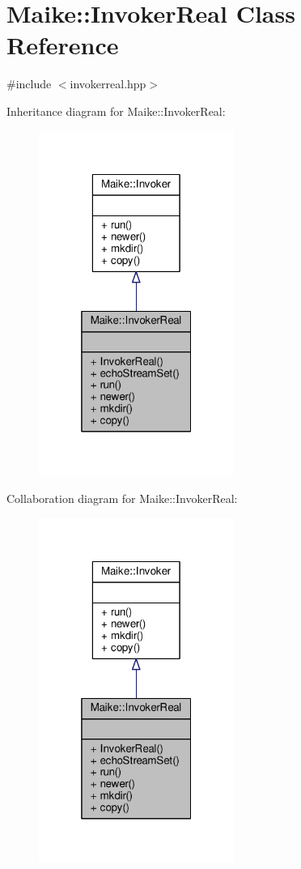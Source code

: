 \hypertarget{class_maike_1_1_invoker_real}{}\section{Maike\+:\+:Invoker\+Real Class Reference}
\label{class_maike_1_1_invoker_real}


{\ttfamily \#include $<$invokerreal.\+hpp$>$}



Inheritance diagram for Maike\+:\+:Invoker\+Real\+:\nopagebreak
\begin{figure}[H]
\begin{center}
\leavevmode
\includegraphics[width=181pt]{class_maike_1_1_invoker_real__inherit__graph}
\end{center}
\end{figure}


Collaboration diagram for Maike\+:\+:Invoker\+Real\+:\nopagebreak
\begin{figure}[H]
\begin{center}
\leavevmode
\includegraphics[width=181pt]{class_maike_1_1_invoker_real__coll__graph}
\end{center}
\end{figure}
